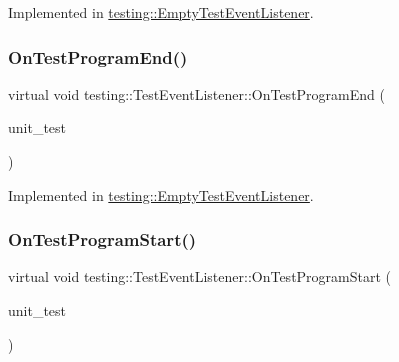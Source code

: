 Implemented in \mbox{\hyperlink{classtesting_1_1_empty_test_event_listener_a59e7f7d9f2e2d089a6e8c1e2577f4718}{testing\+::\+Empty\+Test\+Event\+Listener}}.

\mbox{\label{classtesting_1_1_test_event_listener_ad15b6246d94c268e233487a86463ef3d}} 
\subsubsection{\texorpdfstring{OnTestProgramEnd()}{OnTestProgramEnd()}}
{\footnotesize\ttfamily virtual void testing\+::\+Test\+Event\+Listener\+::\+On\+Test\+Program\+End (\begin{DoxyParamCaption}\item[{const \mbox{\hyperlink{classtesting_1_1_unit_test}{Unit\+Test}} \&}]{unit\+\_\+test }\end{DoxyParamCaption})\hspace{0.3cm}{\ttfamily [pure virtual]}}



Implemented in \mbox{\hyperlink{classtesting_1_1_empty_test_event_listener_a0abcc02bd2331a2e29ad6f4d9daf2a32}{testing\+::\+Empty\+Test\+Event\+Listener}}.

\mbox{\label{classtesting_1_1_test_event_listener_a5f6c84f39851e8a603a2d2e10063816b}} 
\subsubsection{\texorpdfstring{OnTestProgramStart()}{OnTestProgramStart()}}
{\footnotesize\ttfamily virtual void testing\+::\+Test\+Event\+Listener\+::\+On\+Test\+Program\+Start (\begin{DoxyParamCaption}\item[{const \mbox{\hyperlink{classtesting_1_1_unit_test}{Unit\+Test}} \&}]{unit\+\_\+test }\end{DoxyParamCaption})\hspace{0.3cm}{\ttfamily [pure virtual]}}



